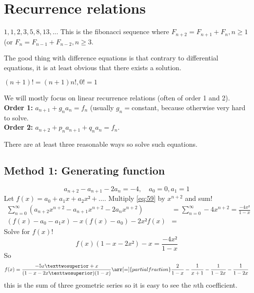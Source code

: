 \documentclass[english]{lbscript}
\begin{document}
\section{Recurrence relations}

\begin{example}{}{}
	\(1,1,2,3,5,8,13,...\) This is the fibonacci sequence where \(F_{n+2}=F_{n+1}+F_{n}, n≥1\) (or \(F_n=F_{n-1}+F_{n-2}, n≥3\).
\end{example}
The good thing with difference equations is that contrary to differential equations, it is at least obvious that there exists a solution.


\begin{example}{}{}
	\((n+1)! = (n+1)n!, 0!=1\)
\end{example}

We will mostly focus on linear recurrence relations (often of order 1 and 2).\\
\textbf{Order 1:} \(a_{n+1} + g_n a_n = f_n\) (usually \(g_n=\)constant, because otherwise very hard to solve.\\
\textbf{Order 2:} \(a_{n+2} + p_n a_{n+1} + q_n a_n=f_n\).

There are at least three reasonable ways so solve such equations.


\subsection{Method 1: Generating function}
\label{sec:method-1:-generating}
\begin{example}{}{}
	\begin{equation}
		\label{eq:59}
		a_{n+2} - a_{n+1} - 2a_n = -4, \quad a_0=0, a_1=1
	\end{equation}
	Let \(f(x)=a_0+a_1x+a_2x²+\dots\). Multiply \cref{eq:59} by \(x^{n+2}\) and sum!
	\begin{align}
		\label{eq:54}
		∑_{n=0}^{∞} \left( a_{n+2}x^{n+2} - a_{n+1} x^{n+2} - 2a_n x^{n+2} \right)
		                                                                      & = ∑_{n=0}^{∞} -4 x^{n+2}
		= \frac{-4x²}{1-x}                                                                               \\
		\left(f(x) - a_0 - a_1x \right) - x\left(f(x) - a_0 \right) - 2x²f(x) & =
	\end{align}
	Solve for \(f(x)\)!
	\begin{equation}
		\label{eq:60}
		f(x) \left(1-x-2x² \right)  - x = \frac{-4x²}{1-x}
	\end{equation}
	So
	\begin{equation}
		\label{eq:61}
		f(x) = \frac{-5x²+x}{(1-x-2x²)(1-x)} \arr[=]{partial fraction} \frac{2}{1-x} - \frac{1}{x+1} - \frac{1}{1-2x} - \frac{1}{1-2x}
	\end{equation}
	this is the sum of three geometric series so it is easy to see the \(n\)th coefficient.
\end{example}
\end{document}
